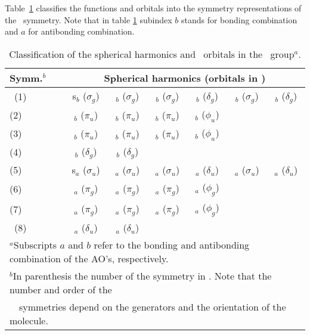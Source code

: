 Table~\ref{tab:d2h} classifies 
the functions and orbitals into the symmetry representations of the \Dth\
symmetry. Note that in table \ref{tab:d2h} subindex $b$ stands for bonding combination and
$a$ for antibonding combination. 

\begin{table}[ht]
\caption{\label{tab:d2h}Classification of the spherical harmonics and \Dinfh\ orbitals in the \Dth\ group$^a$.}
\begin{tabular}{lcccccc}
\\
Symm.$^b$    &  \multicolumn{6}{c}{Spherical harmonics (orbitals in \Dinfh) }\\
\hline
\aog~(1)  &  s$_b$ ($\sigma_g$) & \pz$_b$ ($\sigma_g$) & \dzt$_b$ ($\sigma_g$) & \dxtyt$_b$ ($\delta_g$) & \fztt$_b$ ($\sigma_g$) & \fz$_b$ ($\delta_g$) \\
\bttu(2)  &  \px$_b$ ($\pi_u$) & \dxz$_b$ ($\pi_u$) & \fx$_b$ ($\pi_u$) & \fxtt$_b$ ($\phi_u$) \\
\btu(3)  &  \py$_b$ ($\pi_u$) & \dyz$_b$ ($\pi_u$) & \fy$_b$ ($\pi_u$) & \fytt$_b$ ($\phi_u$) \\
\bog(4)  &  \dxy$_b$ ($\delta_g$) & \fxyz$_b$ ($\delta_g$)\\
\bou(5)  &  s$_a$ ($\sigma_u$) & \pz$_a$ ($\sigma_u$) & \dzt$_a$ ($\sigma_u$) & \dxtyt$_a$ ($\delta_u$) & \fztt$_a$ ($\sigma_u$) & \fz$_a$ ($\delta_u$) \\
\btg(6)  &  \py$_a$ ($\pi_g$) & \dyz$_a$ ($\pi_g$) & \fy$_a$ ($\pi_g$) & \fytt$_a$ ($\phi_g$) \\
\bttg(7)  &  \px$_a$ ($\pi_g$) & \dxz$_a$ ($\pi_g$) & \fx$_a$ ($\pi_g$) & \fxtt$_a$ ($\phi_g$) \\
\aou~(8)  &  \dxy$_a$ ($\delta_u$) & \fxyz$_a$ ($\delta_u$)\\
\hline
\multicolumn{7}{l}{\footnotesize{$^a$Subscripts $a$ and $b$ refer to the bonding and antibonding combination of the AO's, respectively.}}\\
\multicolumn{7}{l}{\footnotesize{$^b$In parenthesis the number of the symmetry in \molcas. Note that the number and order of the}}\\
\multicolumn{7}{l}{\footnotesize{~~symmetries depend on the generators and the orientation of the molecule.}}
\end{tabular}
\end{table}

